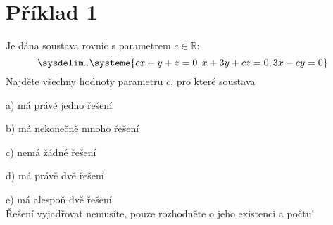 \section*{Příklad 1}
Je dána soustava rovnic s parametrem $c \in \mathbb{R}$:
\begin{equation*}
  \sysdelim..\systeme{
    cx + y + z = 0,
    x + 3y + cz = 0,
    3x - cy = 0
  }
\end{equation*}
Najděte všechny hodnoty parametru $c$, pro které soustava

a) má právě jedno řešení

b) má nekonečně mnoho řešení

c) nemá žádné řešení

d) má právě dvě řešení

e) má alespoň dvě řešení \\
Řešení vyjadřovat nemusíte, pouze rozhodněte o jeho existenci a počtu!
